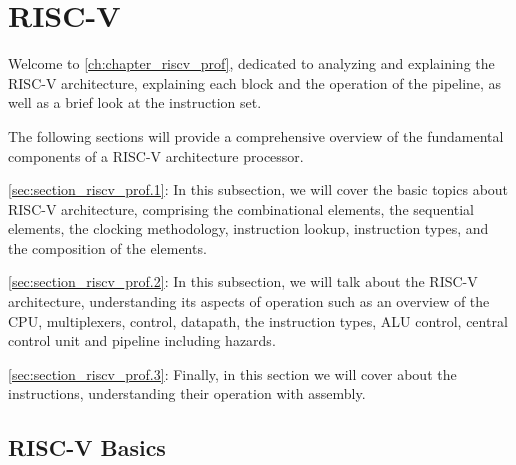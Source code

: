 %
%
%
%
%


\chapter{RISC-V} \label{ch:chapter_riscv_prof}

Welcome to \autoref{ch:chapter_riscv_prof}, dedicated to analyzing and explaining the RISC-V architecture, explaining each block and the operation of the pipeline, as well as a brief look at the instruction set.

The following sections will provide a comprehensive overview of the fundamental components of a RISC-V architecture processor.

\autoref{sec:section_riscv_prof.1}:
    In this subsection, we will cover the basic topics about RISC-V architecture, comprising the combinational elements, the sequential elements, the clocking methodology, instruction lookup, instruction types, and the composition of the elements.
    
\autoref{sec:section_riscv_prof.2}:
In this subsection, we will talk about the RISC-V architecture, understanding its aspects of operation such as an overview of the CPU, multiplexers, control, datapath, the instruction types, ALU control, central control unit and pipeline including hazards.

\autoref{sec:section_riscv_prof.3}:
Finally, in this section we will cover about the instructions, understanding their operation with assembly.

    \section{RISC-V Basics} \label{sec:section_riscv_prof.1}
    
